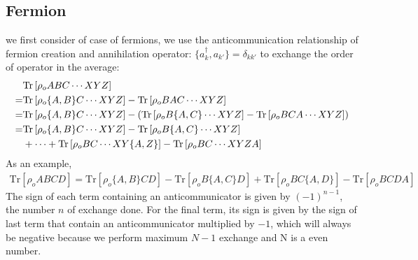 \documentclass{article}
\begin{document}
\subsection*{Fermion}
we first consider of case of fermions, we use the anticommunication relationship
of fermion creation and annihilation operator: $\{ a_k^{\dagger} , a_{k'} \} = \delta_{kk'}$ to 
exchange the order of operator in the average:
\begin{align}
    &\text{Tr}\left[ \rho_o ABC \cdots XYZ  \right] \notag \\
    = &\text{Tr}\left[ \rho_o \{A,B\} C \cdots XYZ  \right] - \text{Tr}\left[ \rho_o BAC \cdots XYZ  \right] \notag \\
    = &\text{Tr}\left[ \rho_o \{A,B\} C \cdots XYZ  \right] - \left( \text{Tr}\left[ \rho_o B\{A,C\} \cdots XYZ  \right] - \text{Tr}\left[ \rho_o BCA \cdots XYZ  \right] \right) \notag \\
    = &\text{Tr}\left[ \rho_o \{A,B\} C \cdots XYZ  \right] - \text{Tr}\left[ \rho_o B\{A,C\} \cdots XYZ  \right] \notag \\
    & + \cdots + \text{Tr}\left[ \rho_o BC \cdots XY\{A,Z\}  \right] - \text{Tr}\left[ \rho_o BC \cdots XYZA  \right] \label{contraction1}
\end{align}
As an example, 
\begin{align}
    \text{Tr}\left[ \rho_o ABCD  \right] = \text{Tr}\left[ \rho_o\{A,B\} CD \right] - \text{Tr}\left[ \rho_o B\{A,C\} D \right] + \text{Tr}\left[ \rho_o BC\{A,D\} \right] - \text{Tr}\left[ \rho_o BCDA \right]
\end{align}
The sign of each term containing an anticommunicator is given by $(-1)^{n-1}$, the number $n$ of exchange done. For the final term, its sign
is given by the sign of last term that contain an anticommunicator multiplied by $-1$, which will always be negative because we perform maximum
$N-1$ exchange and N is a even number. 
\end{document}
